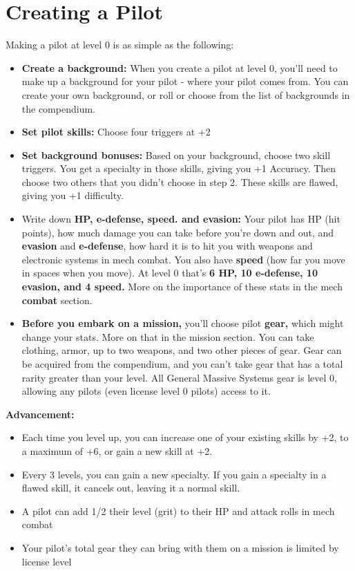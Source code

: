 \section{Creating a Pilot}

Making a pilot at level 0 is as simple as the following:

\begin{itemize}
\item \textbf{Create a background:} When you create a pilot at level 0, you'll need to make up a background for your pilot - where your pilot comes from. You can create your own background, or roll or choose from the list of backgrounds in the compendium.
\item \textbf{Set pilot skills:} Choose four triggers at +2
\item \textbf{Set background bonuses:} Based on your background, choose two skill triggers. You get a specialty in those skills, giving you +1 Accuracy. Then choose two others that you didn't choose in step 2. These skills are flawed, giving you +1 difficulty.
\item Write down \textbf{HP, e-defense, speed. and evasion:} Your pilot has HP (hit points), how much damage you can take before you're down and out, and \textbf{evasion} and \textbf{e-defense}, how hard it is to hit you with weapons and electronic systems in mech combat. You also have \textbf{speed} (how far you move in spaces when you move). At level 0 that's \textbf{6 HP, 10 e-defense, 10 evasion, and 4 speed.} More on the importance of these stats in the mech \textbf{combat} section.
\item \textbf{Before you embark on a mission,} you'll choose pilot \textbf{gear,} which might change your stats. More on that in the mission section. You can take clothing, armor, up to two weapons, and two other pieces of gear. Gear can be acquired from the compendium, and you can't take gear that has a total rarity greater than your level. All General Massive Systems gear is level 0, allowing any pilots (even license level 0 pilots) access to it.
\end{itemize}

\textbf{Advancement:}
\begin{itemize}
\item Each time you level up, you can increase one of your existing skills by +2, to a maximum of +6, or gain a new skill at +2.
\item Every 3 levels, you can gain a new specialty. If you gain a specialty in a flawed skill, it cancels out, leaving it a normal skill.
\item A pilot can add 1/2 their level (grit) to their HP and attack rolls in mech combat
\item Your pilot's total gear they can bring with them on a mission is limited by license level
\end{itemize}
